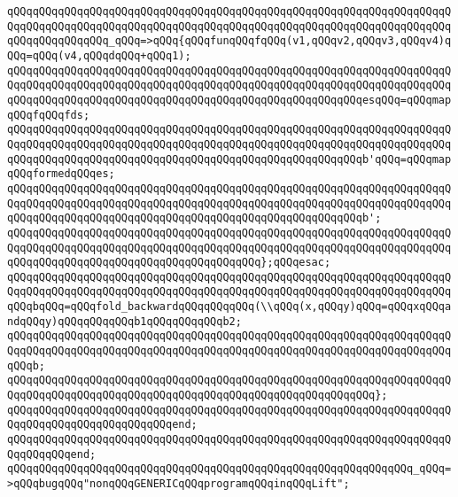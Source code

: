 \verb|qQQqqQQqqQQqqQQqqQQqqQQqqQQqqQQqqQQqqQQqqQQqqQQqqQQqqQQqqQQqqQQqqQQqqQQqqQQqqQQqqQQqqQQqqQQqqQQqqQQqqQQqqQQqqQQqqQQqqQQqqQQqqQQqqQQqqQQqqQQqqQQqqQQqqQQqqQQq_qQQq=>qQQq{qQQqfunqQQqfqQQq(v1,qQQqv2,qQQqv3,qQQqv4)qQQq=qQQq(v4,qQQqdqQQq+qQQq1);|\newline
\verb|qQQqqQQqqQQqqQQqqQQqqQQqqQQqqQQqqQQqqQQqqQQqqQQqqQQqqQQqqQQqqQQqqQQqqQQqqQQqqQQqqQQqqQQqqQQqqQQqqQQqqQQqqQQqqQQqqQQqqQQqqQQqqQQqqQQqqQQqqQQqqQQqqQQqqQQqqQQqqQQqqQQqqQQqqQQqqQQqqQQqqQQqqQQqqQQqqQQqesqQQq=qQQqmapqQQqfqQQqfds;|\newline
\verb|qQQqqQQqqQQqqQQqqQQqqQQqqQQqqQQqqQQqqQQqqQQqqQQqqQQqqQQqqQQqqQQqqQQqqQQqqQQqqQQqqQQqqQQqqQQqqQQqqQQqqQQqqQQqqQQqqQQqqQQqqQQqqQQqqQQqqQQqqQQqqQQqqQQqqQQqqQQqqQQqqQQqqQQqqQQqqQQqqQQqqQQqqQQqqQQqqQQqb'qQQq=qQQqmapqQQqformedqQQqes;|\newline
\newline
\verb|qQQqqQQqqQQqqQQqqQQqqQQqqQQqqQQqqQQqqQQqqQQqqQQqqQQqqQQqqQQqqQQqqQQqqQQqqQQqqQQqqQQqqQQqqQQqqQQqqQQqqQQqqQQqqQQqqQQqqQQqqQQqqQQqqQQqqQQqqQQqqQQqqQQqqQQqqQQqqQQqqQQqqQQqqQQqqQQqqQQqqQQqqQQqqQQqqQQqb';|\newline
\verb|qQQqqQQqqQQqqQQqqQQqqQQqqQQqqQQqqQQqqQQqqQQqqQQqqQQqqQQqqQQqqQQqqQQqqQQqqQQqqQQqqQQqqQQqqQQqqQQqqQQqqQQqqQQqqQQqqQQqqQQqqQQqqQQqqQQqqQQqqQQqqQQqqQQqqQQqqQQqqQQqqQQqqQQqqQQqqQQqqQQq};qQQqesac;|\newline
\newline
\verb|qQQqqQQqqQQqqQQqqQQqqQQqqQQqqQQqqQQqqQQqqQQqqQQqqQQqqQQqqQQqqQQqqQQqqQQqqQQqqQQqqQQqqQQqqQQqqQQqqQQqqQQqqQQqqQQqqQQqqQQqqQQqqQQqqQQqqQQqqQQqqQQqbqQQq=qQQqfold_backwardqQQqqQQqqQQq(\\qQQq(x,qQQqy)qQQq=qQQqxqQQqandqQQqy)qQQqqQQqqQQqb1qQQqqQQqqQQqb2;|\newline
\newline
\verb|qQQqqQQqqQQqqQQqqQQqqQQqqQQqqQQqqQQqqQQqqQQqqQQqqQQqqQQqqQQqqQQqqQQqqQQqqQQqqQQqqQQqqQQqqQQqqQQqqQQqqQQqqQQqqQQqqQQqqQQqqQQqqQQqqQQqqQQqqQQqqQQqb;|\newline
\verb|qQQqqQQqqQQqqQQqqQQqqQQqqQQqqQQqqQQqqQQqqQQqqQQqqQQqqQQqqQQqqQQqqQQqqQQqqQQqqQQqqQQqqQQqqQQqqQQqqQQqqQQqqQQqqQQqqQQqqQQqqQQqqQQq};|\newline
\verb|qQQqqQQqqQQqqQQqqQQqqQQqqQQqqQQqqQQqqQQqqQQqqQQqqQQqqQQqqQQqqQQqqQQqqQQqqQQqqQQqqQQqqQQqqQQqqQQqend;|\newline
\verb|qQQqqQQqqQQqqQQqqQQqqQQqqQQqqQQqqQQqqQQqqQQqqQQqqQQqqQQqqQQqqQQqqQQqqQQqqQQqqQQqend;|\newline
\newline
\verb|qQQqqQQqqQQqqQQqqQQqqQQqqQQqqQQqqQQqqQQqqQQqqQQqqQQqqQQqqQQqqQQq_qQQq=>qQQqbugqQQq"nonqQQqGENERICqQQqprogramqQQqinqQQqLift";|\newline
